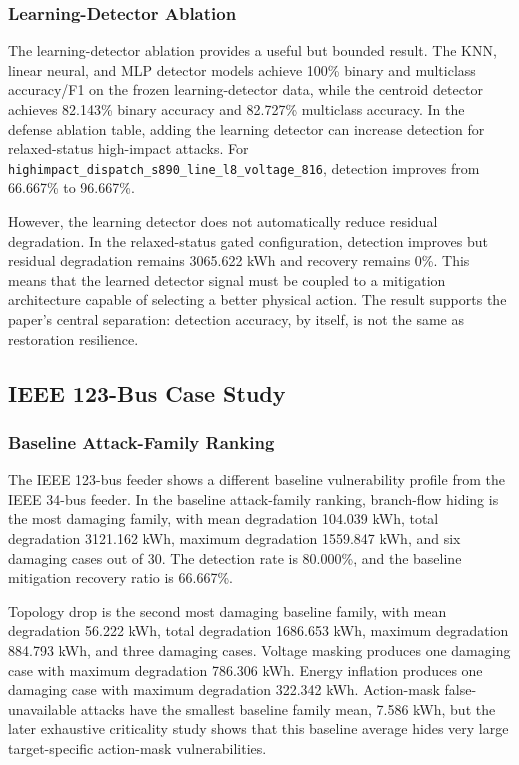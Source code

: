 \subsubsection{Learning-Detector Ablation}
\label{subsubsec:ieee34_learning_detector}

The learning-detector ablation provides a useful but bounded result. The KNN, linear neural, and MLP detector models achieve 100\% binary and multiclass accuracy/F1 on the frozen learning-detector data, while the centroid detector achieves 82.143\% binary accuracy and 82.727\% multiclass accuracy. In the defense ablation table, adding the learning detector can increase detection for relaxed-status high-impact attacks. For \texttt{highimpact\_dispatch\_s890\_line\_l8\_voltage\_816}, detection improves from 66.667\% to 96.667\%.

However, the learning detector does not automatically reduce residual degradation. In the relaxed-status gated configuration, detection improves but residual degradation remains 3065.622 kWh and recovery remains 0\%. This means that the learned detector signal must be coupled to a mitigation architecture capable of selecting a better physical action. The result supports the paper's central separation: detection accuracy, by itself, is not the same as restoration resilience.

\subsection{IEEE 123-Bus Case Study}
\label{subsec:ieee123_results}

\subsubsection{Baseline Attack-Family Ranking}
\label{subsubsec:ieee123_baseline_families}

The IEEE 123-bus feeder shows a different baseline vulnerability profile from the IEEE 34-bus feeder. In the baseline attack-family ranking, branch-flow hiding is the most damaging family, with mean degradation 104.039 kWh, total degradation 3121.162 kWh, maximum degradation 1559.847 kWh, and six damaging cases out of 30. The detection rate is 80.000\%, and the baseline mitigation recovery ratio is 66.667\%.

Topology drop is the second most damaging baseline family, with mean degradation 56.222 kWh, total degradation 1686.653 kWh, maximum degradation 884.793 kWh, and three damaging cases. Voltage masking produces one damaging case with maximum degradation 786.306 kWh. Energy inflation produces one damaging case with maximum degradation 322.342 kWh. Action-mask false-unavailable attacks have the smallest baseline family mean, 7.586 kWh, but the later exhaustive criticality study shows that this baseline average hides very large target-specific action-mask vulnerabilities.

